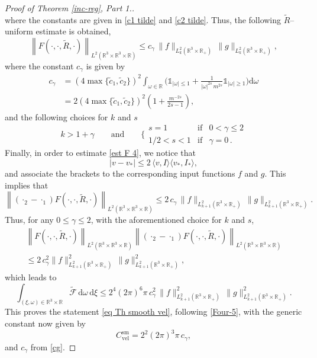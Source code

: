 \documentclass[11pt,a4paper]{amsart}
\newcommand{\bR}{\mathbb{R}^3}
\newcommand{\bRp}{\mathbb{R}_+}
\newcommand{\bRr}{\mathbb{R}}
\newcommand{\bRfp}{\mathbb{R}^3 \times \bRp}
\newcommand{\bRfr}{\mathbb{R}^3 \times \bRr}
\newcommand{\md}{\mathrm{d}}
\newcommand{\g}{\gamma}
\newcommand{\la}{\langle}
\newcommand{\ra}{\rangle}
\newcommand{\Fou}{\mathcal{F}}
\newcommand{\cI}{\tilde{c}_1}
\newcommand{\cIIs}{\tilde{c}_2}
\newcommand{\Csvel}{C_{\text{vel}}^{\text{sm}}}
\begin{document}
\begin{proof}[Proof of Theorem \ref{inc-reg}, Part 1.]
\begin{equation*}
\end{equation*}
where the constants are given in \eqref{c1 tilde} and \eqref{c2 tilde}. 
Thus, the following  $\tilde{R}$--uniform estimate is obtained,
\begin{equation*}
	\left\|   F(\cdot,\cdot,\tilde{R},\cdot) \right\|_{L^2(\bR\times\bR\times\bRr)}   \leq c_\g \,  \| f\|_{L^2_k(\bRfp)} \,  \| g\|_{L^2_k(\bRfp)},
\end{equation*}
where the constant $c_\g $ is given by 
\begin{equation}\label{cg}
	\begin{split}
	c_\g  & = \left(4 \max\{\cI,  \cIIs\} \right)^2  \int_{\omega\in\bRr}	\Bigg( \mathds{1}_{|\omega| \leq 1} 
	+ \frac{1}{|\omega|^{2s}  \, m^{2s}} \mathds{1}_{|\omega| \geq 1} \Bigg) \md \omega 
\\&	= 2 \left(4 \max\{\cI,  \cIIs \} \right)^2    \left( 1 + \frac{m^{-2s}}{2s-1} \right),
 	\end{split}
\end{equation}
and the following   choices for $k$ and $s$
\begin{equation*}
k>1+\gamma \qquad \text{and} \qquad
\bigg\{\begin{array}{clc}
s = 1 &\text{if} & 0<\gamma\leq 2 \\
1/2<s<1 & \text{if} & \gamma=0\,.
\end{array}
\end{equation*}
 Finally, in order to estimate \eqref{est F 4}, we notice that 
\begin{equation*}
	|v-v_*| \leq 2 \, \la v,I \ra  \la v_*,I_* \ra,
\end{equation*}
and associate the brackets to the corresponding input functions $f$ and $g$.  This implies that
\begin{equation*}
		\left\| (\cdot_2-\cdot_1)  F(\cdot,\cdot,\tilde {R},\cdot)  \right\|_{L^2(\bR\times\bR\times\bRr)}  \leq 2 \, c_\g \,  \| f\|_{L^2_{k+1}(\bRfp)} \,  \| g\|_{L^2_{k+1}(\bRfp)}.
\end{equation*}
Thus, for any $0\leq \g \leq 2$, with the aforementioned choice for $k$ and $s$,
\begin{multline*}
	\left\|   F(\cdot,\cdot,\tilde{R},\cdot) \right\|_{L^2(\bR\times\bR\times\bRr)} 
	\left\| (\cdot_2-\cdot_1)  F(\cdot,\cdot,\tilde{R},\cdot)  \right\|_{L^2(\bR\times\bR\times\bRr)}\\  
	\leq 2 \, c_\g^2  \| f\|^2_{L^2_{k+1}(\bRfp)} \,  \| g\|^2_{L^2_{k+1}(\bRfp)},
\end{multline*}
which leads to
\begin{equation*}
	\int_{(\xi,\omega)\in \bRfr}	\tilde{\Fou} \, \md \omega \, \md \xi 
	\leq
	 2^4 (2\pi)^{6}  \pi \, c_\g^2 \,  \| f\|^2_{L^2_{k+1}(\bRfp)} \,  \| g\|^2_{L^2_{k+1}(\bRfp)}.
\end{equation*}
This proves the statement \eqref{eq Th smooth vel}, following \eqref{Four-5}, with the generic constant now given by
\begin{equation}\label{C smooth vel}
\Csvel =2^2 (2\pi)^{3}  \pi \, c_\g,
\end{equation}
and $c_\g$ from \eqref{cg}.



\end{proof}
\end{document}
